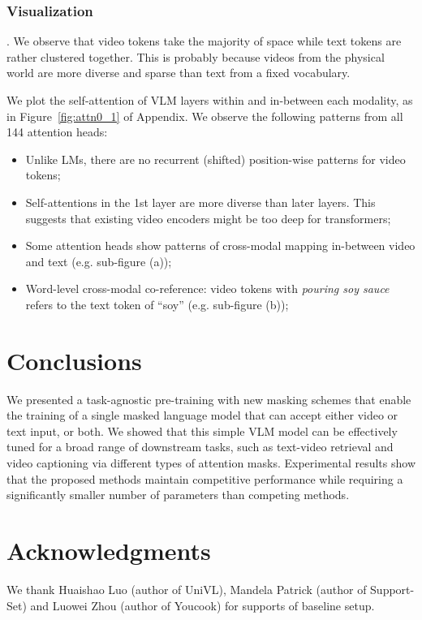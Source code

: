 \documentclass[11pt,a4paper]{article}
\begin{document}
\subsubsection{Visualization}.
We observe that video tokens take the majority of space while text tokens are rather clustered together. This is probably because videos from the physical world are more diverse and sparse than text from a fixed vocabulary.

We plot the self-attention of VLM layers within and in-between each modality, as in Figure~\ref{fig:attn0_1} of Appendix.
We observe the following patterns from all 144 attention heads:
\begin{itemize}
    \item Unlike LMs, there are no recurrent (shifted) position-wise patterns for video tokens;
    \item Self-attentions in the 1st layer are more diverse than later layers. This suggests that existing video encoders might be too deep for transformers;
    \item Some attention heads show patterns of cross-modal mapping in-between video and text (e.g. sub-figure (a));
    \item Word-level cross-modal co-reference: video tokens with \textit{pouring soy sauce} refers to the text token of ``soy'' (e.g. sub-figure (b));
\end{itemize}

\section{Conclusions}
We presented a task-agnostic pre-training with new masking schemes that enable the training of a single masked language model that can accept either video or text input, or both.
We showed that this simple VLM model can be effectively tuned for a broad range of downstream tasks, such as text-video retrieval and video captioning via different types of attention masks.
Experimental results show that the proposed methods maintain competitive performance while requiring a significantly smaller number of parameters than competing methods.

\section*{Acknowledgments}
We thank Huaishao Luo (author of UniVL\cite{luo2020univilm}), Mandela Patrick (author of Support-Set\cite{patrick2021supportset}) and Luowei Zhou (author of Youcook\cite{zhou2017towards}) for supports of baseline setup.
\end{document}
